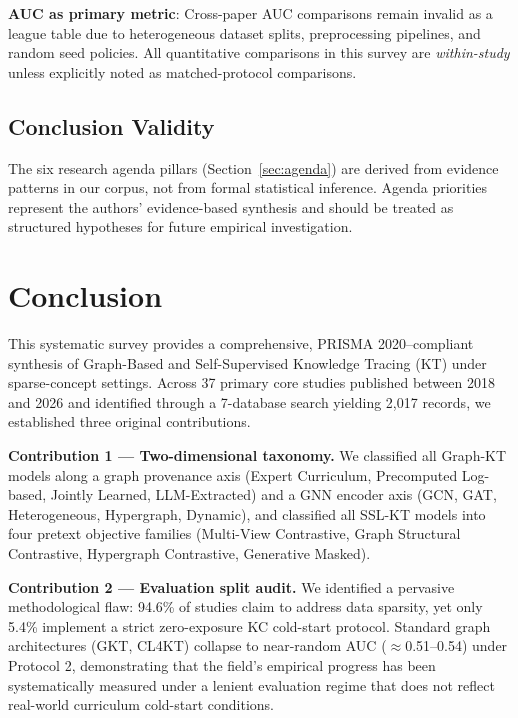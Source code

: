 \documentclass[10pt,journal,compsoc]{IEEEtran}
\begin{document}
\textbf{AUC as primary metric}: Cross-paper AUC comparisons remain invalid as a league table due to heterogeneous dataset splits, preprocessing pipelines, and random seed policies. All quantitative comparisons in this survey are \textit{within-study} unless explicitly noted as matched-protocol comparisons.

\subsection{Conclusion Validity}
The six research agenda pillars (Section~\ref{sec:agenda}) are derived from evidence patterns in our corpus, not from formal statistical inference. Agenda priorities represent the authors' evidence-based synthesis and should be treated as structured hypotheses for future empirical investigation.

\section{Conclusion}
\label{sec:conclusion}

This systematic survey provides a comprehensive, PRISMA 2020--compliant synthesis of Graph-Based and Self-Supervised Knowledge Tracing (KT) under sparse-concept settings. Across 37 primary core studies published between 2018 and 2026 and identified through a 7-database search yielding 2,017 records, we established three original contributions.

\textbf{Contribution 1 --- Two-dimensional taxonomy.} We classified all Graph-KT models along a graph provenance axis (Expert Curriculum, Precomputed Log-based, Jointly Learned, LLM-Extracted) and a GNN encoder axis (GCN, GAT, Heterogeneous, Hypergraph, Dynamic), and classified all SSL-KT models into four pretext objective families (Multi-View Contrastive, Graph Structural Contrastive, Hypergraph Contrastive, Generative Masked).

\textbf{Contribution 2 --- Evaluation split audit.} We identified a pervasive methodological flaw: 94.6\% of studies claim to address data sparsity, yet only 5.4\% implement a strict zero-exposure KC cold-start protocol. Standard graph architectures (GKT, CL4KT) collapse to near-random AUC ($\approx$0.51--0.54) under Protocol 2, demonstrating that the field's empirical progress has been systematically measured under a lenient evaluation regime that does not reflect real-world curriculum cold-start conditions.
\end{document}
